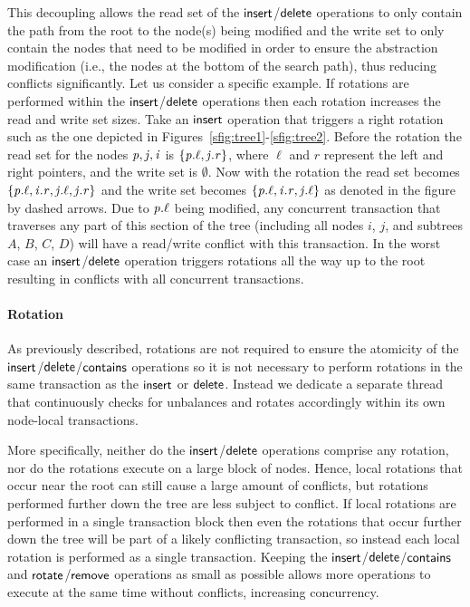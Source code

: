 This decoupling allows the read set of the $\act{insert}$/$\lit{delete}$ operations to only contain the path from the root to the node(s) being modified and the write set to only contain
the nodes that need to be modified in order to ensure the abstraction modification (i.e., the nodes at the bottom of the search path), thus reducing conflicts significantly.
Let us consider a specific example.
If rotations are performed within the $\act{insert}$/$\act{delete}$ operations then each rotation increases the read and write set sizes.
Take an $\act{insert}$ operation that triggers a right rotation such as the one depicted in Figures~\ref{sfig:tree1}-\ref{sfig:tree2}.
Before the rotation the read set for the nodes $\ms{p},\ms{j},\ms{i}$ is $\{\ms{p.\ell}, \ms{j.r}\}$, where $\ell$ and $r$ represent the left and right pointers, and the write set is $\emptyset$.
Now with the rotation the read set becomes $\{\ms{p.\ell}, \ms{i.r}, \ms{j.\ell}, \ms{j.r}\}$ and the write set becomes $\{\ms{p.\ell}, \ms{i.r}, \ms{j.\ell}\}$
as denoted in the figure by dashed arrows.
Due to $\ms{p.\ell}$ being modified, any concurrent transaction that traverses any part of this section of the tree (including all nodes $i$, $j$, and subtrees $A$, $B$, $C$, $D$)
will have a read/write conflict with this transaction.
In the worst case an $\act{insert}$/$\act{delete}$ operation triggers rotations all the way up to the root resulting in conflicts with all concurrent transactions.

\paragraph{Rotation}
As previously described, rotations are not required to ensure the atomicity of the $\act{insert}$/$\act{delete}$/$\act{contains}$ operations so it is not necessary to perform rotations in the same transaction as the $\act{insert}$ or $\act{delete}$. Instead we dedicate a separate thread that continuously checks for unbalances and rotates accordingly within its own node-local transactions.

More specifically, neither do the $\act{insert}$/$\act{delete}$ operations comprise any rotation, nor do the rotations execute
on a large block of nodes. Hence, local
rotations that occur near the root can still cause a large amount of conflicts, but rotations performed further down the tree are less subject to conflict.
If local rotations are performed in a single transaction block then even the rotations that occur further down the tree will be part of a likely conflicting transaction, 
so instead each local rotation is performed as a single transaction.
Keeping the $\act{insert}$/$\act{delete}$/$\act{contains}$ and $\act{rotate}$/$\act{remove}$ operations as small as possible allows more operations to execute at the same time without conflicts, increasing concurrency.


